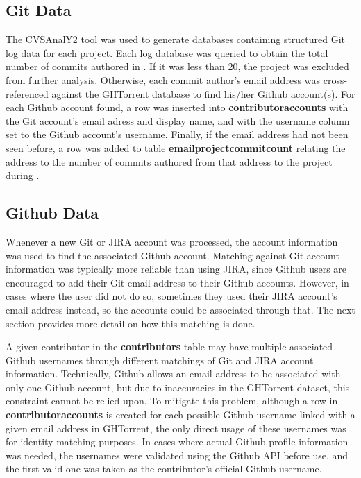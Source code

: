\subsection{Git Data}\label{gitsec}
The CVSAnalY2 tool was used to generate databases containing structured Git log data for each project. Each log database was queried to obtain the total number of commits authored in \timeperiod{}. If it was less than 20, the project was excluded from further analysis. Otherwise, each commit author's email address was cross-referenced against the GHTorrent database to find his/her Github account(s). For each Github account found, a row was inserted into \textbf{contributoraccounts} with the Git account's email adress and display name, and with the username column set to the Github account's username. Finally, if the email address had not been seen before, a row was added to table \textbf{emailprojectcommitcount} relating the address to the number of commits authored from that address to the project during \timeperiod{}.
\subsection{Github Data}\label{githubsec}
Whenever a new Git or JIRA account was processed, the account information was used to find the associated Github account. Matching against Git account information was typically more reliable than using JIRA, since Github users are encouraged to add their Git email address to their Github accounts. However, in cases where the user did not do so, sometimes they used their JIRA account's email address instead, so the accounts could be associated through that. The next section provides more detail on how this matching is done.

A given contributor in the \textbf{contributors} table may have multiple associated Github usernames through different matchings of Git and JIRA account information. Technically, Github allows an email address to be associated with only one Github account, but due to inaccuracies in the GHTorrent dataset, this constraint cannot be relied upon. To mitigate this problem, although a row in \textbf{contributoraccounts} is created for each possible Github username linked with a given email address in GHTorrent, the only direct usage of these usernames was for identity matching purposes. In cases where actual Github profile information was needed, the usernames were validated using the Github API before use, and the first valid one was taken as the contributor's official Github username.

